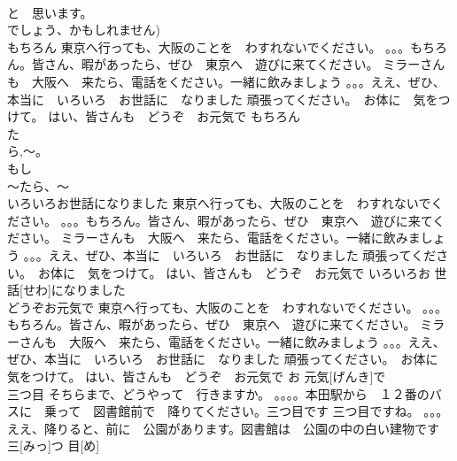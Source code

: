 \documentclass[8pt]{extreport}
\begin{document}
\begin{CJK}{UTF8}{min}
\\	と　思います。
\\	でしょう、かもしれません)	
\\	もちろん	東京へ行っても、大阪のことを　わすれないでください。 。。。もちろん。皆さん、暇があったら、ぜひ　東京へ　遊びに来てください。 ミラーさんも　大阪へ　来たら、電話をください。一緒に飲みましょう 。。。ええ、ぜひ、本当に　いろいろ　お世話に　なりました 頑張ってください。　お体に　気をつけて。 はい、皆さんも　どうぞ　お元気で	もちろん			
\\	た
\\	ら,～。
\\	もし
\\	～たら、～		
\\	いろいろお世話になりました	東京へ行っても、大阪のことを　わすれないでください。 。。。もちろん。皆さん、暇があったら、ぜひ　東京へ　遊びに来てください。 ミラーさんも　大阪へ　来たら、電話をください。一緒に飲みましょう 。。。ええ、ぜひ、本当に　いろいろ　お世話に　なりました 頑張ってください。　お体に　気をつけて。 はい、皆さんも　どうぞ　お元気で	いろいろお 世話[せわ]になりました			
\\	どうぞお元気で	東京へ行っても、大阪のことを　わすれないでください。 。。。もちろん。皆さん、暇があったら、ぜひ　東京へ　遊びに来てください。 ミラーさんも　大阪へ　来たら、電話をください。一緒に飲みましょう 。。。ええ、ぜひ、本当に　いろいろ　お世話に　なりました 頑張ってください。　お体に　気をつけて。 はい、皆さんも　どうぞ　お元気で	お 元気[げんき]で			
\\	三つ目	そちらまで、どうやって　行きますか。 。。。。本田駅から　１２番のバスに　乗って　図書館前で　降りてください。三つ目です 三つ目ですね。 。。。ええ、降りると、前に　公園があります。図書館は　公園の中の白い建物です	三[みっ]つ 目[め]			
\end{CJK}
\end{document}
